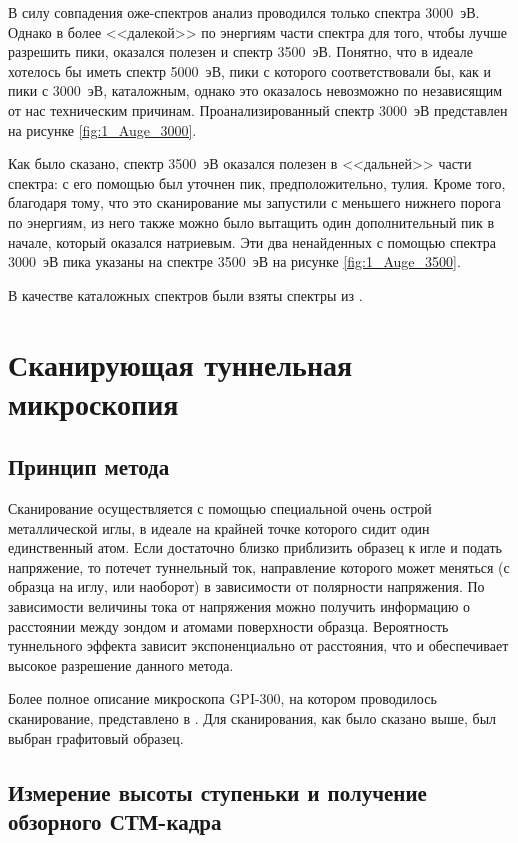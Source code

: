 \documentclass[a4paper, 12pt]{article}
\begin{document}
	В силу совпадения оже-спектров анализ проводился только спектра 3000~эВ. Однако в более <<далекой>> по энергиям части спектра для того, чтобы лучше разрешить пики, оказался полезен и спектр 3500~эВ. Понятно, что в идеале хотелось бы иметь спектр 5000~эВ, пики с которого соответствовали бы, как и пики с 3000~эВ, каталожным, однако это оказалось невозможно по независящим от нас техническим причинам. Проанализированный спектр 3000~эВ представлен на рисунке \ref{fig:1_Auge_3000}.
	
	Как было сказано, спектр 3500~эВ оказался полезен в <<дальней>> части спектра: с его помощью был уточнен пик, предположительно, тулия. Кроме того, благодаря тому, что это сканирование мы запустили с меньшего нижнего порога по энергиям, из него также можно было вытащить один дополнительный пик в начале, который оказался натриевым. Эти два ненайденных с помощью спектра 3000~эВ пика указаны на спектре 3500~эВ на рисунке \ref{fig:1_Auge_3500}. 
	
	В качестве каталожных спектров были взяты спектры из \cite{Auger}.
	
	\section{Сканирующая туннельная микроскопия}
	
	\subsection{Принцип метода}
	
	Сканирование осуществляется с помощью специальной очень острой металлической иглы, в идеале на крайней точке которого сидит один единственный атом. Если достаточно близко приблизить образец к игле и подать напряжение, то потечет туннельный ток, направление которого может меняться (с образца на иглу, или наоборот) в зависимости от полярности напряжения. По зависимости величины тока от напряжения можно получить информацию о расстоянии между зондом и атомами поверхности образца. Вероятность туннельного эффекта зависит экспоненциально от расстояния, что и обеспечивает высокое разрешение данного метода.
	
	Более полное описание микроскопа GPI-300, на котором проводилось сканирование, представлено в \cite{Eltsov}. Для сканирования, как было сказано выше, был выбран графитовый образец.
	
	\subsection{Измерение высоты ступеньки и получение обзорного СТМ-кадра}
	
\end{document}

